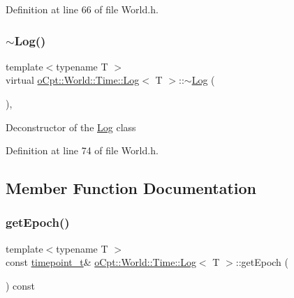 Definition at line 66 of file World.\+h.

\hypertarget{classo_cpt_1_1_world_1_1_time_1_1_log_a842b91ce3d76d1a4e0a95831944baca5}{}\label{classo_cpt_1_1_world_1_1_time_1_1_log_a842b91ce3d76d1a4e0a95831944baca5} 
\subsubsection{\texorpdfstring{$\sim$\+Log()}{~Log()}}
{\footnotesize\ttfamily template$<$typename T $>$ \\
virtual \hyperlink{classo_cpt_1_1_world_1_1_time_1_1_log}{o\+Cpt\+::\+World\+::\+Time\+::\+Log}$<$ T $>$\+::$\sim$\hyperlink{classo_cpt_1_1_world_1_1_time_1_1_log}{Log} (\begin{DoxyParamCaption}{ }\end{DoxyParamCaption})\hspace{0.3cm}{\ttfamily [inline]}, {\ttfamily [virtual]}}

Deconstructor of the \hyperlink{classo_cpt_1_1_world_1_1_time_1_1_log}{Log} class 

Definition at line 74 of file World.\+h.



\subsection{Member Function Documentation}
\hypertarget{classo_cpt_1_1_world_1_1_time_1_1_log_abf0caaa0f48e2316200cad9d3dff46bc}{}\label{classo_cpt_1_1_world_1_1_time_1_1_log_abf0caaa0f48e2316200cad9d3dff46bc} 
\subsubsection{\texorpdfstring{get\+Epoch()}{getEpoch()}}
{\footnotesize\ttfamily template$<$typename T $>$ \\
const \hyperlink{classo_cpt_1_1_world_1_1_time_a6a6e782c3c90622c1c7070b0a223ec4c}{timepoint\+\_\+t}\& \hyperlink{classo_cpt_1_1_world_1_1_time_1_1_log}{o\+Cpt\+::\+World\+::\+Time\+::\+Log}$<$ T $>$\+::get\+Epoch (\begin{DoxyParamCaption}{ }\end{DoxyParamCaption}) const\hspace{0.3cm}{\ttfamily [inline]}}

